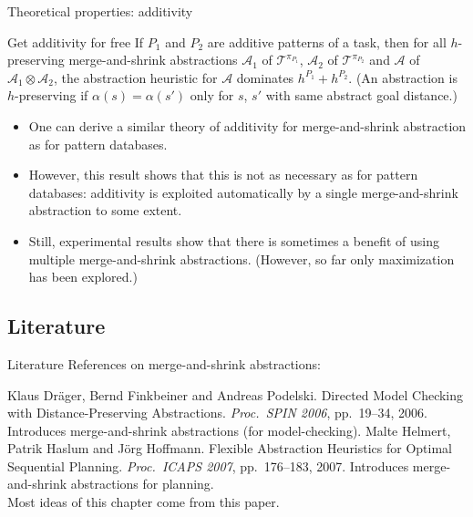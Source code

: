 \documentclass{gkibeamer}
\begin{document}
\begin{frame}{Theoretical properties: additivity}
  \begin{block}{Get additivity for free}
    If $P_1$ and $P_2$ are \alert{additive patterns} of a {\sasplus}
    task, then for \alert{all} $h$-preserving merge-and-shrink
    abstractions $\mathcal A_1$ of $\mathcal T^{\pi_{P_1}}$, $\mathcal
    A_2$ of $\mathcal T^{\pi_{P_2}}$ and $\mathcal A$ of $\mathcal A_1
    \otimes \mathcal A_2$, the abstraction heuristic for
    \alert{$\mathcal A$ dominates $h^{P_1} + h^{P_2}$}. (An
    abstraction is \alert{$h$-preserving} if $\alpha(s) = \alpha(s')$
    only for $s$, $s'$ with same abstract goal distance.)
  \end{block}
  
  \begin{itemize}
  \item One can derive a similar \alert{theory of additivity} for
    merge-and-shrink abstraction as for pattern databases.
  \item However, this result shows that this is \alert{not as
    necessary} as for pattern databases: additivity is
    \alert{exploited automatically} by a single merge-and-shrink
    abstraction to some extent.
  \item Still, experimental results show that there is sometimes a
    benefit of using multiple merge-and-shrink abstractions. (However,
    so far only maximization has been explored.)
  \end{itemize}
\end{frame}

\subsection{Literature}

\begin{frame}{Literature}
  References on merge-and-shrink abstractions:
  \begin{thebibliography}{1}
  \bibitem{} Klaus Dr\"ager, Bernd Finkbeiner and Andreas Podelski.
    \newblock Directed Model Checking with Distance-Preserving
    Abstractions.
    \newblock \emph{Proc.~SPIN 2006}, pp.~19--34, 2006.
    \newblock \alert{Introduces} merge-and-shrink abstractions (for
    model-checking).
  \bibitem{} Malte Helmert, Patrik Haslum and J\"org Hoffmann.
    \newblock Flexible Abstraction Heuristics for Optimal Sequential
    Planning.
    \newblock \emph{Proc.~ICAPS 2007}, pp.~176--183, 2007.
    \newblock Introduces merge-and-shrink abstractions \alert{for
      planning}. \\ Most ideas of this chapter come from this paper.
  \end{thebibliography}
\end{frame}
\end{document}
